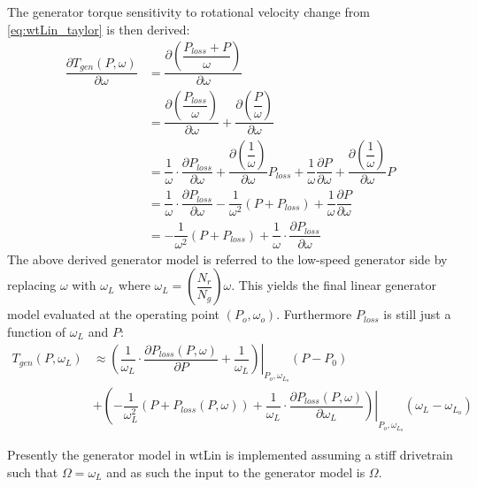 The generator torque sensitivity to rotational velocity change from \cref{eq:wtLin_taylor} is then derived:
\begin{align}
	\dfrac{\partial T_{gen}(P, \omega)}{\partial \omega} & = \dfrac{\partial \left (\dfrac{P_{loss} +  P}{\omega}\right )}{\partial \omega} \\
	& = \dfrac{\partial \left (\dfrac{P_{loss}}{\omega} \right )}{\partial \omega} + \dfrac{\partial \left (\dfrac{P}{\omega} \right )}{\partial \omega} \\
	& = \dfrac{1}{\omega} \cdot \dfrac{\partial P_{loss}}{\partial \omega} + \dfrac{\partial \left (\dfrac{1}{\omega} \right)}{\partial \omega} P_{loss} + \dfrac{1}{\omega} \dfrac{\partial P}{\partial \omega} + \dfrac{\partial \left (\dfrac{1}{\omega} \right )}{\partial \omega} P \\
	& = \dfrac{1}{\omega} \cdot  \dfrac{\partial P_{loss}}{\partial \omega} - \dfrac{1}{\omega^2}(P + P_{loss}) + \dfrac{1}{\omega} \dfrac{\partial P}{\partial \omega} \\
	& = -\dfrac{1}{\omega^2}(P + P_{loss}) + \dfrac{1}{\omega} \cdot \dfrac{\partial P_{loss}}{\partial \omega}
\end{align}
The above derived generator model is referred to the low-speed generator side by replacing $ \omega $ with $ \omega_L $ where $ \omega_L = \left (\dfrac{N_r}{N_g} \right ) \omega $. This yields the final linear generator model evaluated at the operating point $ (P_o, \omega_o) $. Furthermore $P_{loss}$ is still just a function of $ \omega_L $ and $ P $:
\begin{equation}
	\begin{split}
		T_{gen}(P, \omega_L) 	& \approx \left. \left ( \dfrac{1}{\omega_L} \cdot \dfrac{\partial P_{loss}(P, \omega)}{\partial P} + \dfrac{1}{\omega_L} \right ) \right |_{P_o,\omega_{L_o}} (P - P_0) \\ 
		& + \left ( -\dfrac{1}{\omega_L^2}(P + P_{loss}(P, \omega)) + \left. \dfrac{1}{\omega_L} \cdot \dfrac{\partial P_{loss}(P, \omega)}{\partial \omega_L} \right ) \right |_{P_o,\omega_{L_o}} (\omega_L - \omega_{L_o})
	\end{split}
\end{equation}


Presently the generator model in wtLin is implemented assuming a stiff drivetrain such that $ \Omega = \omega_L $ and as such the input to the generator model is $ \Omega $.  


